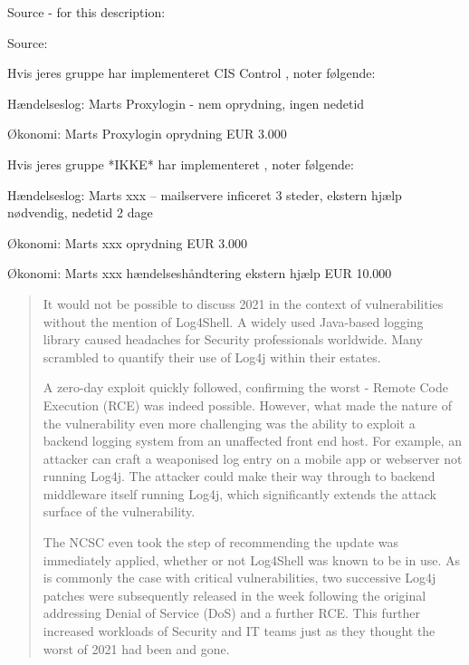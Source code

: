 \documentclass[Screen16to9,17pt]{foils}
\begin{document}
Source - for this description:\\


\begin{quote}

\end{quote}

Source:




Hvis jeres gruppe har implementeret CIS Control , noter følgende:
\begin{list2}
\item Hændelseslog: Marts Proxylogin - nem oprydning, ingen nedetid
\item Økonomi: Marts Proxylogin oprydning EUR 3.000
\end{list2}


Hvis jeres gruppe *IKKE* har implementeret , noter følgende:
\begin{list2}
\item Hændelseslog: Marts xxx -- mailservere inficeret 3 steder, ekstern hjælp nødvendig, nedetid 2 dage
\item Økonomi: Marts xxx oprydning EUR 3.000
\item Økonomi: Marts xxx hændelseshåndtering ekstern hjælp EUR 10.000
\end{list2}





\begin{quote}
It would not be possible to discuss 2021 in the context of vulnerabilities without the mention of Log4Shell. A widely used Java-based logging library caused headaches for Security professionals worldwide. Many scrambled to quantify their use of Log4j within their estates.

A zero-day exploit quickly followed, confirming the worst - Remote Code Execution (RCE) was indeed possible. However, what made the nature of the vulnerability even more challenging was the ability to exploit a backend logging system from an unaffected front end host. For example, an attacker can craft a weaponised log entry on a mobile app or webserver not running Log4j. The attacker could make their way through to backend middleware itself running Log4j, which significantly extends the attack surface of the vulnerability.

The NCSC even took the step of recommending the update was immediately applied, whether or not Log4Shell was known to be in use. As is commonly the case with critical vulnerabilities, two successive Log4j patches were subsequently released in the week following the original addressing Denial of Service (DoS) and a further RCE. This further increased workloads of Security and IT teams just as they thought the worst of 2021 had been and gone.
\end{quote}
\end{document}
